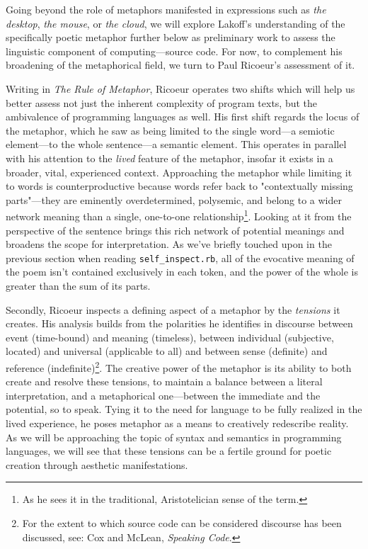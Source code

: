 \documentclass{article}
\begin{document}
Going beyond the role of metaphors manifested in expressions such as \emph{the desktop}, \emph{the mouse}, or \emph{the cloud}, we will explore Lakoff's understanding of the specifically poetic metaphor further below as preliminary work to assess the linguistic component of computing—source code. For now, to complement his broadening of the metaphorical field, we turn to Paul Ricoeur's assessment of it.

Writing in \emph{The Rule of Metaphor}, Ricoeur operates two shifts which will help us better assess not just the inherent complexity of program texts, but the ambivalence of programming languages as well. His first shift regards the locus of the metaphor, which he saw as being limited to the single word—a semiotic element—to the whole sentence—a semantic element\cite{ricoeur_rule_2003}. This operates in parallel with his attention to the \emph{lived} feature of the metaphor, insofar it exists in a broader, vital, experienced context. Approaching the metaphor while limiting it to words is counterproductive because words refer back to "contextually missing parts"—they are eminently overdetermined, polysemic, and belong to a wider network meaning than a single, one-to-one relationship\footnote{As he sees it in the traditional, Aristotelician sense of the term.}. Looking at it from the perspective of the sentence brings this rich network of potential meanings and broadens the scope for interpretation. As we've briefly touched upon in the previous section when reading \lstinline{self_inspect.rb}, all of the evocative meaning of the poem isn't contained exclusively in each token, and the power of the whole is greater than the sum of its parts.

Secondly, Ricoeur inspects a defining aspect of a metaphor by the \emph{tensions} it creates. His analysis builds from the polarities he identifies in discourse between event (time-bound) and meaning (timeless), between individual (subjective, located) and universal (applicable to all) and between sense (definite) and reference (indefinite)\footnote{For the extent to which source code can be considered discourse has been discussed, see: Cox and McLean, \emph{Speaking Code}.}. The creative power of the metaphor is its ability to both create and resolve these tensions, to maintain a balance between a literal interpretation, and a metaphorical one—between the immediate and the potential, so to speak. Tying it to the need for language to be fully realized in the lived experience, he poses metaphor as a means to creatively redescribe reality. As we will be approaching the topic of syntax and semantics in programming languages, we will see that these tensions can be a fertile ground for poetic creation through aesthetic manifestations.
\end{document}
